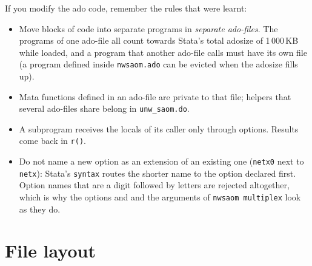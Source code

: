 If you modify the ado code, remember the rules that were learnt:
\begin{itemize}[nosep]
  \item Move blocks of code into separate programs in \emph{separate ado-files}. The programs of one ado-file all count towards Stata's total adosize of 1\,000\,KB while loaded, and a program that another ado-file calls must have its own file (a program defined inside \texttt{nwsaom.ado} can be evicted when the adosize fills up).
  \item Mata functions defined in an ado-file are private to that file; helpers that several ado-files share belong in \texttt{unw\_saom.do}.
  \item A subprogram receives the locals of its caller only through options. Results come back in \texttt{r()}.
  \item Do not name a new option as an extension of an existing one (\texttt{netx0} next to \texttt{netx}): Stata's \texttt{syntax} routes the shorter name to the option declared first. Option names that are a digit followed by letters are rejected altogether, which is why the options  and  and the arguments of \texttt{nwsaom multiplex} look as they do.
\end{itemize}

\section{File layout}

